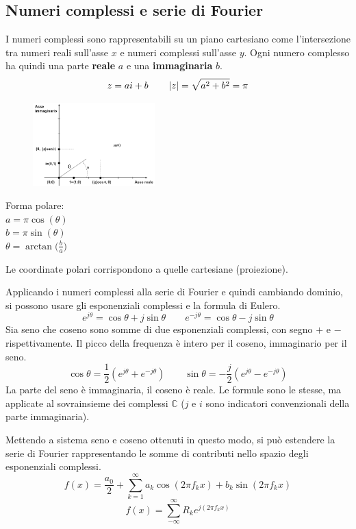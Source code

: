 \subsection{Numeri complessi e serie di Fourier}
I numeri complessi sono rappresentabili su un piano cartesiano come l'intersezione tra numeri reali sull'asse $x$ e numeri complessi sull'asse $y$. Ogni numero complesso ha quindi una parte \textbf{reale} $a$ e una \textbf{immaginaria} $b$.
$$z = ai+b \qquad \left|z\right| = \sqrt{a^2 + b^2} = \pi$$

\begin{figure}
	\vspace{-15pt}
		\includegraphics[width=0.42\textwidth]{Lezioni/Immagini/cartesiano} 
	\vspace{-30pt}
\end{figure}

Forma polare:  \\ 
$a = \pi\cos(\theta)$ \\ 
$b = \pi\sin(\theta)$ \\ 
$\theta = \arctan\big(\frac{b}{a}\big)$

Le coordinate polari corrispondono a quelle cartesiane (proiezione). 

Applicando i numeri complessi alla serie di Fourier e quindi cambiando dominio, si possono usare gli esponenziali complessi e la formula di Eulero. 
$$e^{j\theta} = \cos\theta + j\sin\theta \qquad e^{-j\theta} = \cos\theta - j\sin\theta$$
Sia seno che coseno sono somme di due esponenziali complessi, con segno $+$ e $-$ rispettivamente. Il picco della frequenza è intero per il coseno, immaginario per il seno. 
$$\cos\theta = \frac{1}{2}(e^{j\theta} + e^{-j\theta}) \qquad \sin\theta = -\frac{j}{2}(e^{j\theta} - e^{-j\theta})$$
La parte del seno è immaginaria, il coseno è reale. Le formule sono le stesse, ma applicate al sovrainsieme dei complessi $\mathbb{C}$ ($j$ e $i$ sono indicatori convenzionali della parte immaginaria).

Mettendo a sistema seno e coseno ottenuti in questo modo, si può estendere la serie di Fourier rappresentando le somme di contributi nello spazio degli esponenziali complessi.
$$f(x) = \frac{a_0}{2} + \sum_{k=1}^{\infty} a_k \cos(2\pi f_kx) + b_k\sin(2\pi f_kx)$$
$$f(x) = \sum_{-\infty}^{\infty} R_ke^{j(2\pi f_kx)}$$

